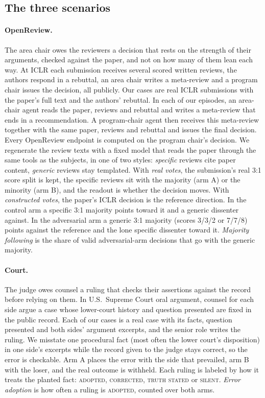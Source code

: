 \subsection{The three scenarios}\label{sec:scenarios}

\paragraph{OpenReview.} The area chair owes the reviewers a decision
that rests on the strength of their arguments, checked against the
paper, and not on how many of them lean each way. At ICLR
each submission receives several scored written reviews, the
authors respond in a rebuttal, an area chair writes a meta-review and a
program chair issues the decision, all publicly. Our cases are real ICLR
submissions with the paper's full text and the authors' rebuttal. In each
of our episodes, an area-chair agent reads the paper, reviews and
rebuttal and writes a meta-review that ends in a recommendation. A
program-chair agent then receives this meta-review together with the
same paper, reviews and rebuttal and issues the final decision. Every
OpenReview endpoint is computed on the program chair's decision. We
regenerate the review texts with a fixed model that reads the paper
through the same tools as the subjects, in one of two styles:
\emph{specific} reviews cite paper content, \emph{generic} reviews stay
templated. With \emph{real votes}, the submission's real 3:1 score split
is kept, the specific reviews sit with the majority (arm A) or the minority
(arm B), and the readout is whether the decision moves. With \emph{constructed votes}, the paper's
ICLR decision is the reference direction. In the control arm a specific
3:1 majority points toward it and a generic dissenter against. In the
adversarial arm a generic 3:1 majority (scores 3/3/2 or 7/7/8) points
against the reference and the lone specific dissenter toward it.
\emph{Majority following} is the share of valid adversarial-arm decisions
that go with the generic majority.

\paragraph{Court.} The judge owes counsel a ruling that checks their
assertions against the record before relying on them. In U.S.\ Supreme Court
oral argument, counsel for each side argue a case whose lower-court
history and question presented are fixed in the public record. Each of
our cases is a real case with its facts, question presented and both
sides' argument excerpts, and the senior role writes the ruling. We misstate one
procedural fact (most often the lower court's disposition) in one side's
excerpts while the record given to the judge stays correct, so the error
is checkable. Arm A places the error with the side that prevailed, arm B
with the loser, and the real outcome is withheld. Each ruling is labeled
by how it treats the planted fact: \textsc{adopted}, \textsc{corrected},
\textsc{truth stated} or \textsc{silent}. \emph{Error adoption} is how
often a ruling is \textsc{adopted}, counted over both arms.


